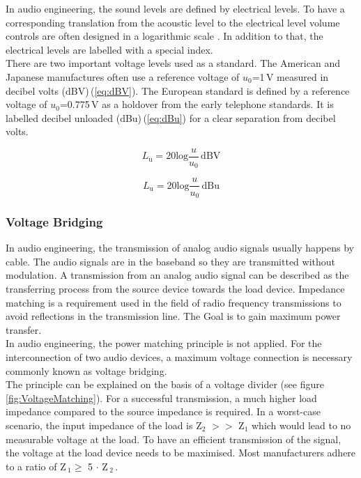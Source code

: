 In audio engineering, the sound levels are defined by electrical levels.
To have a corresponding translation from the acoustic level to the electrical level
volume controls are often designed in a logarithmic scale \cite[p.\,34]{Gorne:2015}.
In addition to that, the electrical levels are labelled with a special index.\\
There are two important voltage levels used as a standard.
The American and Japanese manufactures often use a reference voltage of $u_0$=1\,V measured in
decibel volts (dBV)\,(\ref{eq:dBV}). 
The European standard is defined by a reference voltage of $u_0$=0.775\,V as a holdover from the early telephone standards. It is labelled decibel unloaded (dBu)\,(\ref{eq:dBu}) for a clear separation  from decibel volts.


\begin{equation}
L_{\mathrm{u}} = 20 \mathrm{log} \frac{u}{u_0}\,\mathrm{dBV}
\label{eq:dBV}
\end{equation}

\begin{equation}
L_{\mathrm{u}} = 20 \mathrm{log} \frac{u}{u_0}\,\mathrm{dBu}
\label{eq:dBu}
\end{equation}



\subsubsection{Voltage Bridging}\label{cap:TheoryVoltageBriding}

In audio engineering, the transmission of analog audio signals usually happens by cable.
The audio signals are in the baseband so they are transmitted without modulation.
A transmission from an analog audio signal can be described as the transferring process
from the source device towards the load device.
Impedance matching is a requirement used in the field of radio frequency transmissions to  
avoid reflections in the transmission line. The Goal is to gain maximum power transfer.\\
In audio engineering, the power matching principle is not applied.
For the interconnection of two audio devices, a maximum voltage connection is necessary commonly known
as voltage bridging.\\
The principle can be explained on the basis of a voltage divider (see figure \ref{fig:VoltageMatching}).
For a successful transmission, a much higher load impedance compared to the source impedance is required.
In a worst-case scenario, the input impedance of the load is Z$_2$ $>>$ Z$_1$ which would lead to
no measurable voltage at the load. 
To have an efficient transmission of the signal, the voltage at the load device needs to be maximised.
Most manufacturers adhere to a ratio of Z\,$_{1} \geq$ 5 $\cdot$ Z\,$_{2}$\,\cite[p.\,212]{Gorne:2015}.


